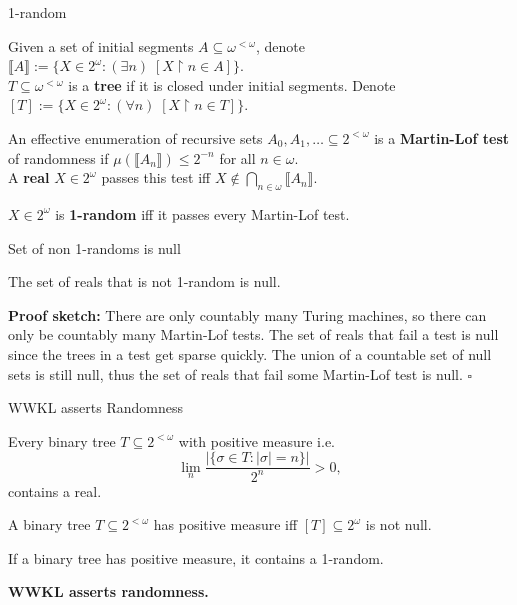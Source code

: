 \begin{frame}{1-random}
  \begin{notation*}
    Given a set of initial segments $A\subseteq\omega^{<\omega}$, denote
    $\llbracket A\rrbracket:= \{X\in2^\omega: (\exists n)\;
    [X\restriction n \in A]\}$.\\
    \vspace{0.5em}
    $T\subseteq\omega^{<\omega}$ is a \textbf{tree} if it is closed under
    initial segments. Denote $[T]:= \{X\in2^\omega: (\forall n)\;
    [X\restriction n \in T]\}$.
  \end{notation*}

  \begin{define*}
    An effective enumeration of recursive sets
    $A_0,A_1,\ldots \subseteq 2^{<\omega}$ is a \textbf{Martin-Lof test} of
    randomness if $\mu(\llbracket A_n\rrbracket) \leq 2^{-n}$ for all
    $n\in\omega$.\\
    \vspace{0.5em}
    A \textbf{real} $X\in2^\omega$ passes this test iff $X\not\in
    \bigcap_{n\in\omega} \llbracket A_n\rrbracket$.
  \end{define*}

  \begin{define*}
    $X\in2^\omega$ is \textbf{1-random} iff it passes every Martin-Lof
    test.
  \end{define*}
\end{frame}

\begin{frame}{Set of non 1-randoms is null}
  \begin{fact*}
    The set of reals that is not 1-random is null.
  \end{fact*}

  \vspace{2em}
  \textbf{Proof sketch:} There are only countably many Turing machines, so
  there can only be countably many Martin-Lof tests. The set of reals that
  fail a test is null since the trees in a test get sparse quickly. The
  union of a countable set of null sets is still null, thus the set of
  reals that fail some Martin-Lof test is null. $\square$
\end{frame}

\begin{frame}{WWKL asserts Randomness}
  \begin{thm*}
    Every binary tree $T\subseteq 2^{<\omega}$ with positive measure i.e.
    \[\lim_n \frac{|\{\sigma\in T: |\sigma|=n\}|}{2^n} >0,\]
    contains a real.
  \end{thm*}
  \begin{fact}
    A binary tree $T\subseteq2^{<\omega}$ has positive measure iff
    $[T]\subseteq2^\omega$ is not null.
  \end{fact}
  \begin{coro}
    If a binary tree has positive measure, it contains a 1-random.
  \end{coro}

  \textbf{WWKL asserts randomness.}
\end{frame}


